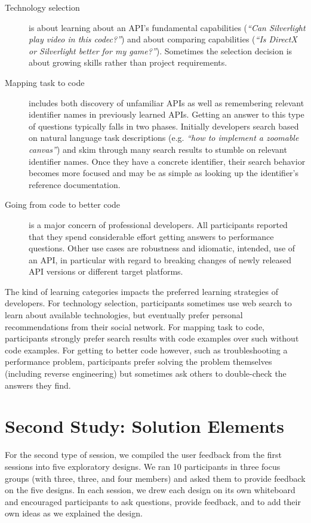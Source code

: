 \begin{description}
\item[Technology selection] is about learning about an API's fundamental capabilities (\emph{``Can Silverlight play video in this codec?''}) and about comparing capabilities (\emph{``Is DirectX or Silverlight better for my game?''}). Sometimes the selection decision is about growing skills rather than project requirements. 

\item[Mapping task to code] includes both discovery of unfamiliar APIs as well as remembering relevant identifier names in previously learned APIs. Getting an answer to this type of questions typically falls in two phases. Initially developers search based on natural language task descriptions (e.g. \emph{``how to implement a zoomable canvas''}) and skim through many search results to stumble on relevant identifier names. Once they have a concrete identifier, their search behavior becomes more focused and may be as simple as looking up the identifier's reference documentation.

\item[Going from code to better code] is a major concern of professional developers. All participants reported that they spend considerable effort getting answers to performance questions. Other use cases are robustness and idiomatic, \ie intended, use of an API, in particular with regard to breaking changes of newly released API versions or different target platforms.

\end{description}

The kind of learning categories impacts the preferred learning strategies of developers. For technology selection, participants sometimes use web search to learn about available technologies, but eventually prefer personal recommendations from their social network.  For mapping task to code, participants strongly prefer search results with code examples over such without code examples. For getting to better code however, such as troubleshooting a performance problem, participants prefer solving the problem themselves (including reverse engineering) but sometimes ask others to double-check the answers they find.

\moarsauce
\section{Second Study: Solution Elements}

For the second type of session, we compiled the user feedback from the first sessions into five exploratory designs. We ran 10 participants in three focus groups (with three, three, and four members) and asked them to provide feedback on the five designs. In each session, we drew each design on its own whiteboard and encouraged participants to ask questions, provide feedback, and to add their own ideas as we explained the design. 

